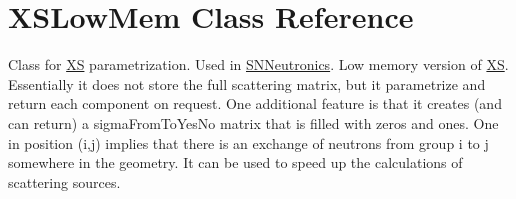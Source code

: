 \hypertarget{classFoam_1_1XSLowMem}{}\section{X\+S\+Low\+Mem Class Reference}
\label{classFoam_1_1XSLowMem}


Class for \hyperlink{classFoam_1_1XS}{XS} parametrization. Used in \hyperlink{classFoam_1_1SNNeutronics}{S\+N\+Neutronics}. Low memory version of \hyperlink{classFoam_1_1XS}{XS}. Essentially it does not store the full scattering matrix, but it parametrize and return each component on request. One additional feature is that it creates (and can return) a sigma\+From\+To\+Yes\+No matrix that is filled with zeros and ones. One in position (i,j) implies that there is an exchange of neutrons from group i to j somewhere in the geometry. It can be used to speed up the calculations of scattering sources.  


